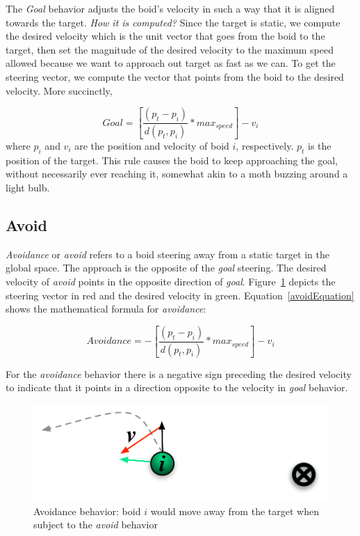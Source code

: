 The \textit{Goal} behavior adjusts the boid's velocity in such a way that it is aligned towards the target. \textit{How it is computed?} Since the target is static, we compute the desired velocity which is the unit vector that goes from the boid to the target, then set the magnitude of the desired velocity to the maximum speed allowed because we want to approach out target as fast as we can. To get the steering vector, we compute the vector that points from the boid to the desired velocity. More succinctly, 

\begin{equation}
\label{goalEquation}
Goal = \left[\frac{(p_t - p_i)}{d(p_t,p_i)} * max_{speed} \right] - v_i
\end{equation}
where $p_i$ and $v_i$ are the position and velocity of boid $i$, respectively. $p_t$ is the position of the target. This rule causes the boid to keep approaching the goal, without necessarily ever reaching it, somewhat akin to a moth buzzing around a light bulb.

\subsection{Avoid}
\textit{Avoidance} or \textit{avoid} refers to a boid steering away from a static target in the global space. The approach is the opposite of the \textit{goal} steering. The desired velocity of \textit{avoid} points in the opposite direction of \textit{goal}. Figure~\ref{avoidPDF} depicts the steering vector in red and the desired velocity in green. Equation~\ref{avoidEquation} shows the mathematical formula for \textit{avoidance}:

\begin{equation}
\label{avoidEquation}
Avoidance = -\left[\frac{(p_t - p_i)}{d(p_t,p_i)} * max_{speed} \right] - v_i
\end{equation}

For the \textit{avoidance} behavior there is a negative sign preceding the desired velocity to indicate that it points in a direction opposite to the velocity in \textit{goal} behavior.

\begin{figure}[htbp]
\begin{center}
\includegraphics[scale=0.75]{figures/avoidance.pdf}
\caption{Avoidance behavior: boid $i$ would move away from the target when subject to the \textit{avoid} behavior}
\label{avoidPDF}
\end{center}
\end{figure}

